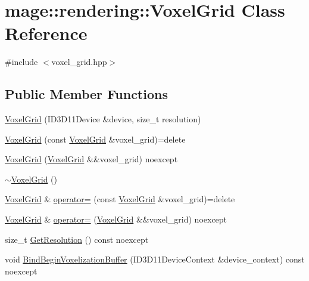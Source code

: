 \hypertarget{classmage_1_1rendering_1_1_voxel_grid}{}\section{mage\+:\+:rendering\+:\+:Voxel\+Grid Class Reference}
\label{classmage_1_1rendering_1_1_voxel_grid}


{\ttfamily \#include $<$voxel\+\_\+grid.\+hpp$>$}

\subsection*{Public Member Functions}
\begin{DoxyCompactItemize}
\item 
\mbox{\hyperlink{classmage_1_1rendering_1_1_voxel_grid_aec475857836dbf56d99f30a9d8f70272}{Voxel\+Grid}} (I\+D3\+D11\+Device \&device, size\+\_\+t resolution)
\item 
\mbox{\hyperlink{classmage_1_1rendering_1_1_voxel_grid_ace9aac1356e41996630c6247ece48417}{Voxel\+Grid}} (const \mbox{\hyperlink{classmage_1_1rendering_1_1_voxel_grid}{Voxel\+Grid}} \&voxel\+\_\+grid)=delete
\item 
\mbox{\hyperlink{classmage_1_1rendering_1_1_voxel_grid_a985cc9f8fbe4e49adf2b61de2b348125}{Voxel\+Grid}} (\mbox{\hyperlink{classmage_1_1rendering_1_1_voxel_grid}{Voxel\+Grid}} \&\&voxel\+\_\+grid) noexcept
\item 
\mbox{\hyperlink{classmage_1_1rendering_1_1_voxel_grid_aa349c9ddd6d6be9f12d7e399a0931f89}{$\sim$\+Voxel\+Grid}} ()
\item 
\mbox{\hyperlink{classmage_1_1rendering_1_1_voxel_grid}{Voxel\+Grid}} \& \mbox{\hyperlink{classmage_1_1rendering_1_1_voxel_grid_a90b94d3a00e365e1a03d1077a5c79a11}{operator=}} (const \mbox{\hyperlink{classmage_1_1rendering_1_1_voxel_grid}{Voxel\+Grid}} \&voxel\+\_\+grid)=delete
\item 
\mbox{\hyperlink{classmage_1_1rendering_1_1_voxel_grid}{Voxel\+Grid}} \& \mbox{\hyperlink{classmage_1_1rendering_1_1_voxel_grid_a9e0ae3de8c583879a3db8b6d787138ac}{operator=}} (\mbox{\hyperlink{classmage_1_1rendering_1_1_voxel_grid}{Voxel\+Grid}} \&\&voxel\+\_\+grid) noexcept
\item 
size\+\_\+t \mbox{\hyperlink{classmage_1_1rendering_1_1_voxel_grid_ab38b97d6f567f2f44fa000a6bb9f305c}{Get\+Resolution}} () const noexcept
\item 
void \mbox{\hyperlink{classmage_1_1rendering_1_1_voxel_grid_a52254c5709b77d6c348eb15b782b5bc4}{Bind\+Begin\+Voxelization\+Buffer}} (I\+D3\+D11\+Device\+Context \&device\+\_\+context) const noexcept

\end{DoxyCompactItemize}
